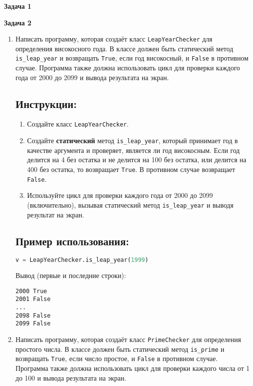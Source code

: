 \textbf{Задача 1}



\textbf{Задача 2}

\begin{enumerate}
    \item

Написать программу, которая создаёт класс \texttt{LeapYearChecker} 
для определения високосного года. В классе должен быть статический метод
\texttt{is\_leap\_year} и возвращать \texttt{True}, если год високосный, 
и \texttt{False} в противном случае. 
Программа также должна использовать цикл для проверки каждого года от 
2000 до 2099 и вывода результата на экран.

\subsection*{Инструкции:}
\begin{enumerate}
    \item Создайте класс \texttt{LeapYearChecker}.
    \item Создайте \textbf{статический} метод \texttt{is\_leap\_year}, который принимает год в качестве аргумента и проверяет, является ли год високосным. Если год делится на 4 без остатка и не делится на 100 без остатка, или делится на 400 без остатка, то возвращает \texttt{True}. В противном случае возвращает \texttt{False}.
    \item Используйте цикл для проверки каждого года от 2000 до 2099 (включительно), вызывая статический метод \texttt{is\_leap\_year} и выводя результат на экран.
\end{enumerate}

\subsection*{Пример использования:}
\begin{lstlisting}[language=Python]
    v = LeapYearChecker.is_leap_year(1999)
\end{lstlisting}
Вывод (первые и последние строки):
\begin{verbatim}
2000 True
2001 False
...
2098 False
2099 False
\end{verbatim}

\item
Написать программу, которая создаёт класс \texttt{PrimeChecker} 
для определения простого числа. В классе должен быть статический метод
\texttt{is\_prime} и возвращать \texttt{True}, если число простое, 
и \texttt{False} в противном случае. 
Программа также должна использовать цикл для проверки каждого числа от 
1 до 100 и вывода результата на экран.


\end{enumerate}
